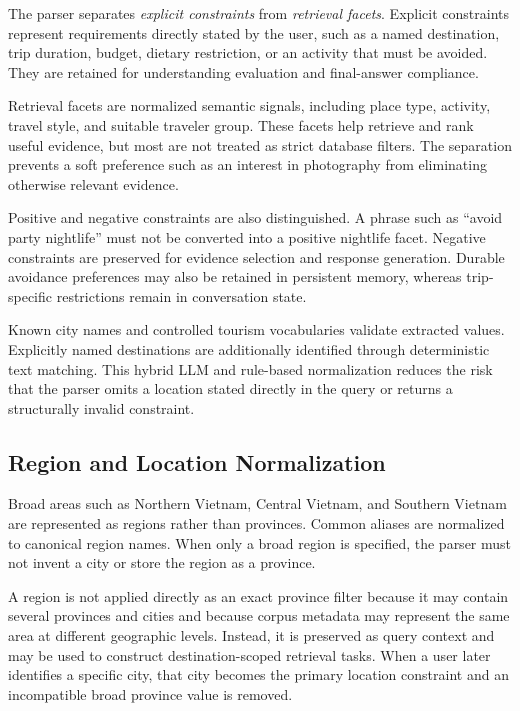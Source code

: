 The parser separates \textit{explicit constraints} from \textit{retrieval
facets}. Explicit constraints represent requirements directly stated by the
user, such as a named destination, trip duration, budget, dietary restriction,
or an activity that must be avoided. They are retained for understanding
evaluation and final-answer compliance.

Retrieval facets are normalized semantic signals, including place type,
activity, travel style, and suitable traveler group. These facets help retrieve
and rank useful evidence, but most are not treated as strict database filters.
The separation prevents a soft preference such as an interest in photography
from eliminating otherwise relevant evidence.

Positive and negative constraints are also distinguished. A phrase such as
``avoid party nightlife'' must not be converted into a positive nightlife
facet. Negative constraints are preserved for evidence selection and response
generation. Durable avoidance preferences may also be retained in persistent
memory, whereas trip-specific restrictions remain in conversation state.

Known city names and controlled tourism vocabularies validate extracted values.
Explicitly named destinations are additionally identified through deterministic
text matching. This hybrid LLM and rule-based normalization reduces the risk
that the parser omits a location stated directly in the query or returns a
structurally invalid constraint.

\subsection{Region and Location Normalization}

Broad areas such as Northern Vietnam, Central Vietnam, and Southern Vietnam are
represented as regions rather than provinces. Common aliases are normalized to
canonical region names. When only a broad region is specified, the parser must
not invent a city or store the region as a province.

A region is not applied directly as an exact province filter because it may
contain several provinces and cities and because corpus metadata may represent
the same area at different geographic levels. Instead, it is preserved as
query context and may be used to construct destination-scoped retrieval tasks.
When a user later identifies a specific city, that city becomes the primary
location constraint and an incompatible broad province value is removed.

